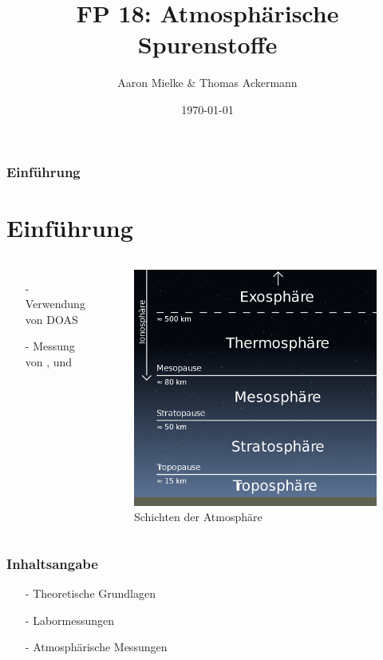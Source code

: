 \documentclass{beamer}
\title{FP 18: Atmosphärische Spurenstoffe}
\author{Aaron Mielke \& Thomas Ackermann}
\date{\today}
\begin{document}
\maketitle


\begin{frame}
	\frametitle{Einführung}
    \section{Einführung}
    \begin{columns}
        \begin{itemize}
            \item[-] Verwendung von DOAS 
            \item[-] Messung von ,  und  
        \end{itemize}
    \begin{figure}
        \includegraphics[width=\textwidth]{fig/photo/erdatmosphäre.png}
        \caption{Schichten der Atmosphäre}
    \end{figure}
    \end{columns}
\end{frame}


\begin{frame}
    \frametitle{Inhaltsangabe}
    \begin{itemize}
        \item[-] Theoretische Grundlagen
    \vfill
		\item[-] Labormessungen
    \vfill
		\item[-] Atmosphärische Messungen 
	\end{itemize}
\end{frame}
\end{document}
